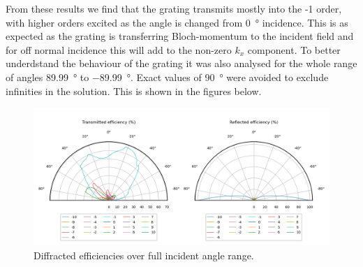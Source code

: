 \documentclass[a4paper,12pt]{scrartcl}
\begin{document}
\begin{table}[!h]
\centering
{}
    \caption{Reflected diffraction efficiencies of the first 10 orders in units of percentage.}
    \label{tab:eta r}
\end{table}
From these results we find that the grating transmits mostly into the -1 order, with higher orders excited as the angle is changed from \SI{0}{\degree} incidence. This is as expected as the grating is transferring Bloch-momentum to the incident field and for off normal incidence this will add to the non-zero $k_x$ component. To better underdstand the behaviour of the grating it was also analysed for the whole range of angles \SI{89.99}{\degree} to \SI{-89.99}{\degree}. Exact values of \SI{90}{\degree} were avoided to exclude infinities in the solution. This is shown in the figures below.
\begin{figure}[!h]
    \centering
    \includegraphics[width=\textwidth]{figures/efficiencies_plot.png}
    \caption{Diffracted efficiencies over full incident angle range.}
    \label{fig:effic plot}
\end{figure}
\end{document}
